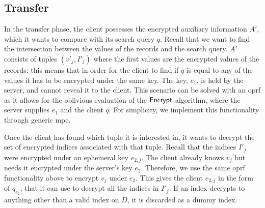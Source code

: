\subsection*{\thesubsection\quad Transfer}\label{subsec:KeywordSearchTransfer}

In the transfer phase, the client possesses the encrypted auxiliary information $ A' $, which it wants to compare with its search query $ q $. Recall that we want to find the intersection between the values of the records and the search query. $ A' $ consists of tuples $ \left( v'_j, I'_j \right) $ where the first values are the encrypted values of the records; this means that in order for the client to find if $ q $ is equal to any of the values it has to be encrypted under the same key. The key, $ e_1 $, is held by the server, and cannot reveal it to the client. This scenario can be solved with an \acrshort{oprf} as it allows for the oblivious evaluation of the $ \mathsf{{Encrypt}} $ algorithm, where the server supplies $ e_1 $ and the client $ q $. For simplicity, we implement this functionality through generic \acrshort{mpc}.

Once the client has found which tuple it is interested in, it wants to decrypt the set of encrypted indices associated with that tuple. Recall that the indices $ I'_j $ were encrypted under an ephemeral key $ e_{2,j}  $. The client already knows $ v_j $ but needs it encrypted under the server's key $ e_2 $. Therefore, we use the same \acrshort{oprf} functionality above to encrypt $ v_j $ under $ e_2 $. This gives the client $ e_{2,j} $ in the form of $ q_{e_2} $,  that it can use to decrypt all the indices in $ I'_j $. If an index decrypts to anything other than a valid index on $ D $, it is discarded as a dummy index.

